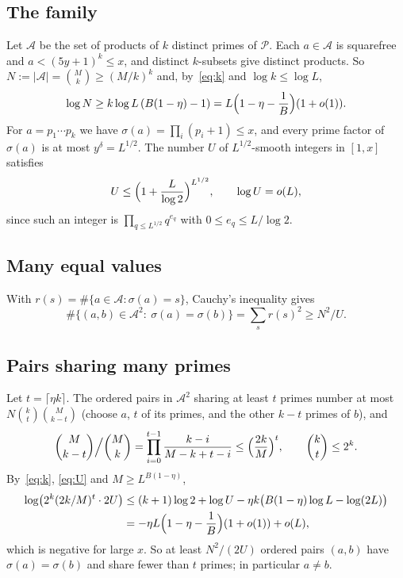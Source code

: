 \documentclass[11pt]{amsart}
\theoremstyle{definition}
\theoremstyle{remark}
\begin{document}
\subsection{The family} Let $\mathcal A$ be the set of products of $k$ distinct primes of $\mathcal P$. Each $a\in\mathcal A$ is squarefree and $a<(5y+1)^k\le x$, and distinct $k$-subsets give distinct products. So $N:=|\mathcal A|=\binom Mk\ge(M/k)^k$ and, by~\eqref{eq:k} and $\log k\le\log L$,
\begin{equation}\label{eq:N}
 \log N\ge k\log L\,(B(1-\eta)-1)=L\Bigl(1-\eta-\frac1B\Bigr)(1+o(1)).
\end{equation}
For $a=p_1\cdots p_k$ we have $\sigma(a)=\prod_i(p_i+1)\le x$, and every prime factor of $\sigma(a)$ is at most $y^\delta=L^{1/2}$. The number $U$ of $L^{1/2}$-smooth integers in $[1,x]$ satisfies
\begin{equation}\label{eq:U}
 U\le\Bigl(1+\frac L{\log2}\Bigr)^{L^{1/2}},\qquad \log U=o(L),
\end{equation}
since such an integer is $\prod_{q\le L^{1/2}}q^{e_q}$ with $0\le e_q\le L/\log2$.

\subsection{Many equal values} With $r(s)=\#\{a\in\mathcal A:\sigma(a)=s\}$, Cauchy's inequality gives
\[
 \#\{(a,b)\in\mathcal A^2:\ \sigma(a)=\sigma(b)\}=\sum_sr(s)^2\ge N^2/U .
\]

\subsection{Pairs sharing many primes} Let $t=\lceil\eta k\rceil$. The ordered pairs in $\mathcal A^2$ sharing at least $t$ primes number at most $N\binom kt\binom M{k-t}$ (choose $a$, $t$ of its primes, and the other $k-t$ primes of $b$), and
\[
 \binom M{k-t}\Big/\binom Mk=\prod_{i=0}^{t-1}\frac{k-i}{M-k+t-i}\le\Bigl(\frac{2k}M\Bigr)^t,\qquad\binom kt\le2^k .
\]
By~\eqref{eq:k}, \eqref{eq:U} and $M\ge L^{B(1-\eta)}$,
\begin{align*}
 \log\bigl(2^k(2k/M)^t\cdot2U\bigr)&\le(k+1)\log2+\log U-\eta k\bigl(B(1-\eta)\log L-\log(2L)\bigr)\\
 &=-\eta L\Bigl(1-\eta-\frac1B\Bigr)(1+o(1))+o(L),
\end{align*}
which is negative for large $x$. So at least $N^2/(2U)$ ordered pairs $(a,b)$ have $\sigma(a)=\sigma(b)$ and share fewer than $t$ primes; in particular $a\ne b$.
\end{document}
